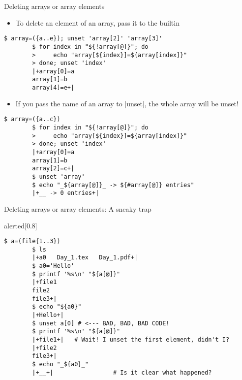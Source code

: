 \begin{frame}[fragile]{Deleting arrays or array elements}
    \vspace{-4mm}
    \begin{itemize}
        \item To delete an element of an array, pass it to the  builtin
    \end{itemize}
    \begin{lstlisting}[style=MyBash, belowskip=-5mm]
        $ array=({a..e}); unset 'array[2]' 'array[3]'
        $ for index in "${!array[@]}"; do
        >     echo "array[${index}]=${array[index]}"
        > done; unset 'index'
        |+array[0]=a
        array[1]=b
        array[4]=e+|
    \end{lstlisting}
    \begin{itemize}
        \item If you pass the name of an array to \bash|unset|, the whole array will be unset!
    \end{itemize}
    \begin{lstlisting}[style=MyBash]
        $ array=({a..c})
        $ for index in "${!array[@]}"; do
        >     echo "array[${index}]=${array[index]}"
        > done; unset 'index'
        |+array[0]=a
        array[1]=b
        array[2]=c+|
        $ unset 'array'
        $ echo "_${array[@]}_ -> ${#array[@]} entries"
        |+__ -> 0 entries+|
    \end{lstlisting}
\end{frame}
\begin{frame}[fragile]{Deleting arrays or array elements: A sneaky trap}
    \vspace{-3mm}
    \begin{varblock}{alerted}[0.8\textwidth]{}
        \large {}
    \end{varblock}
    \begin{lstlisting}[style=MyBash, emph={[7]a, a0}]
        $ a=(file{1..3})
        $ ls
        |+a0   Day_1.tex   Day_1.pdf+|
        $ a0='Hello'
        $ printf '%s\n' "${a[@]}"
        |+file1
        file2
        file3+|
        $ echo "${a0}"
        |+Hello+|
        $ unset a[0] # <--- BAD, BAD, BAD CODE!
        $ printf '%s\n' "${a[@]}"
        |+file1+|   # Wait! I unset the first element, didn't I?
        |+file2
        file3+|
        $ echo "_${a0}_"
        |+__+|                 # Is it clear what happened?
    \end{lstlisting}
\end{frame}
